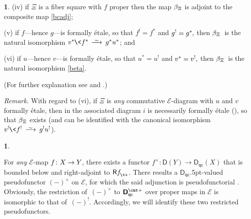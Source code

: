 \documentclass{compositio}
\theoremstyle{plain}
\theoremstyle{definition}
\newtheorem{cosa}[thm]{}
\theoremstyle{remark}
\numberwithin{equation}{thm}
\begin{document}
\begin{cosa}
{\rm(iv)} if $\Xi$ is a fiber square with $f$ proper then the map $\beta_{{\mkern1mu}\Xi}$ is
adjoint to the composite map \eqref{bcadj};{\vspace{2pt}}

{\rm(v)} if $f$---hence $g$---is formally \'etale, so that $f^!=f^*$ and
$g^!=g^*{\mkern-1mu},$ then
$\beta_{{\mkern1mu}\Xi}$~is the natural isomorphism $v^*{\mkern-1mu}\<f^*{{\mkern8mu\longrightarrow \mkern-25.5mu{}^\sim\mkern17mu}} g^*u^*$; and{\vspace{2pt}}

{\rm(vi)} if $u$---hence $v$---is formally \'etale, so that $u^*=u^!$ and
$v^*=v^!{\mkern-1mu},$ then
$\beta_{{\mkern1mu}\Xi}$~is the natural isomorphism \eqref{beta}.{\vspace{3pt}}

\noindent (For further explanation see \cite[Thm.\,4.8.3]{li} and \cite[\S5.2]{Nk}.){\vspace{4pt}}

\noindent\emph{Remark.} With regard to (vi),  if $\Xi$ is \emph{any} commutative ${\mathscr{E}}$-diagram with
$u$ and $v$ formally \'etale, then in the associated diagram
$i$ is necessarily formally \'etale (\cite[(17.1.3(iii) and 17.1.4]{EGA4}), so that $\beta_{{\mkern1mu}\Xi}$ exists
{\vspace{1pt}} (and can be identified with the canonical isomorphism $v^!{\mkern-1mu}\<f^!{{\mkern8mu\longrightarrow \mkern-25.5mu{}^\sim\mkern17mu}} g^!u^!$).
\end{cosa}

\begin{cosa}\label{^times}

For \emph{any} ${\mathscr{E}}$-map $f\colon X\to Y{\mkern-1mu}$, there exists a functor 
$f^\times\colon {\boldsymbol{\mathsf{D}}}(Y)\to{{\boldsymbol{\mathsf{D}}}_{\mathsf{qc}}}(X)$ that is bounded below and right-adjoint to 
${{\mathsf R} f^{}_{{\mkern-1mu}\<*}}{\mkern1mu}$. There results a ${{\boldsymbol{\mathsf{D}}}_{\mathsf{qc}}}${\kern.5pt}-valued pseudofunctor $(-)^\times$ on ${\mathscr{E}}$, for which the said adjunction is pseudo\-functorial
 \cite[Corollary (4.1.2)]{li}. Obviously, the restriction 
of~$(-)^\times$ to ${{\boldsymbol{\mathsf{D}}}_{\mathsf{qc}}^{{\vbox to 0pt{\vskip-.95 ex\hbox{$\scriptstyle \text{\cmt\char'053}$}\vss}}}}$ over proper maps in ${\mathscr{E}}$
is isomorphic to that of~$(-)^!$. Accordingly, we will identify these two restricted pseudofunctors.

\end{cosa}
\end{document}
